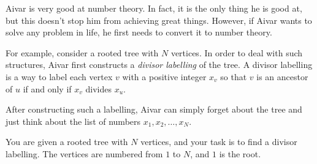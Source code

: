 

\noindent
Aivar is very good at number theory. In fact, it is the only thing he is good at, but this doesn't 
stop him from achieving great things. However, if Aivar wants to solve any problem in life, he first needs
to convert it to number theory.

For example, consider a rooted tree with $N$ vertices. In order to deal with such structures, Aivar first 
constructs a \textit{divisor labelling} of the tree. A divisor labelling is a way to label each 
vertex $v$ with a positive integer $x_v$ so that $v$ is an ancestor of $u$ if and only if $x_v$ divides
$x_u$.

After constructing such a labelling, Aivar can simply forget about the tree and just think about the 
list of numbers $x_1, x_2, \dots, x_N$.

You are given a rooted tree with $N$ vertices, and your task is to find a divisor labelling. 
The vertices are numbered from $1$ to $N$, and $1$ is the root.



